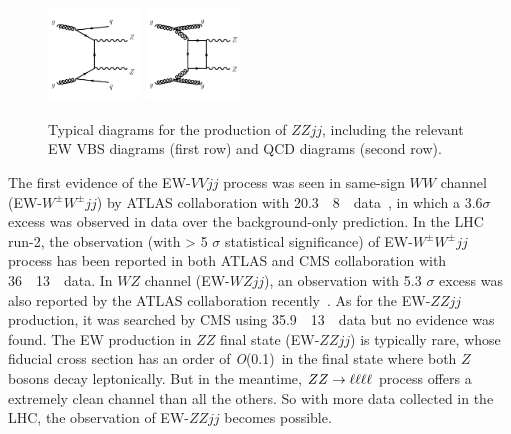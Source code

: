 \begin{figure}[!htbp]
\begin{center}
\includegraphics[width=0.22\textwidth]{figures/VBSZZ/diagram-QCDZZjj-gg.pdf}
\includegraphics[width=0.22\textwidth]{figures/VBSZZ/diagram-QCDZZjj-box.pdf}\\
\end{center}
\caption{Typical diagrams for the production of $ZZjj$, including the relevant EW VBS diagrams (first row) and QCD diagrams (second row).}
\label{fig:vbszz_diagrams}
\end{figure}

The first evidence of the EW-$VVjj$ process was seen in same-sign $WW$ channel (EW-$W^{\pm}W^{\pm}jj$) by ATLAS collaboration with 20.3~\ifb~8~\tev~data~\cite{PhysRevLett.113.141803},
in which a 3.6$\sigma$ excess was observed in data over the background-only prediction.
In the LHC run-2, the observation (with > 5 $\sigma$ statistical significance) of EW-$W^{\pm}W^{\pm}jj$ process has been reported in both ATLAS and CMS collaboration with 36~\ifb~13~\tev~data\cite{PhysRevLett.123.161801, Sirunyan:2017ret}.
In $WZ$ channel (EW-$WZjj$), an observation with 5.3 $\sigma$ excess was also reported by the ATLAS collaboration recently~\cite{2019469}.
As for the EW-$ZZjj$ production, it was searched by CMS using 35.9~\ifb~13~\tev~data but no evidence was found\cite{2017682}.
The EW production in $ZZ$ final state (EW-$ZZjj$) is typically rare, whose fiducial cross section has an order of \textit{O}(0.1)~\ifb in the final state where both $Z$ bosons decay leptonically.
But in the meantime, $ZZ \rightarrow \ell\ell\ell\ell$ process offers a extremely clean channel than all the others. So with more data collected in the LHC, the observation of EW-$ZZjj$ becomes possible.

